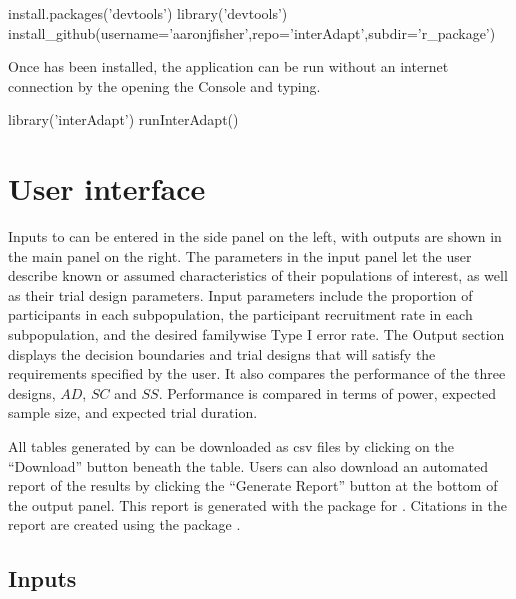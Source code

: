 \documentclass[article]{jss}
\begin{document}
\vspace{5 mm}
\begin{Code}
install.packages('devtools')
library('devtools')
install_github(username='aaronjfisher',repo='interAdapt',subdir='r_package')
\end{Code}
\vspace{5 mm}

Once  has been installed, the application can be run without an internet connection by the opening the  Console and typing.

\vspace{5 mm}
\begin{Code}
library('interAdapt')
runInterAdapt()
\end{Code}
\vspace{5 mm}




\section{User interface}
\label{sec:UI}

Inputs to  can be entered in the side panel on the left, with outputs are shown in the main panel on the right. %
The parameters in the input panel let the user describe known or assumed characteristics of their populations of interest, as well as their trial design parameters. Input parameters include the proportion of participants in each subpopulation, the participant recruitment rate in each subpopulation, and the desired familywise Type I error rate. The Output section displays the decision boundaries and trial designs that will satisfy the requirements specified by the user. It also compares the performance of the three designs, $AD$, $SC$ and $SS$. Performance is compared in terms of power, expected sample size, and expected trial duration.

All tables generated by  can be downloaded as csv files by clicking on the ``Download'' button beneath the table. Users can also download an automated report of the results by clicking the ``Generate Report'' button at the bottom of the output panel. This report is generated with the  package for  \citep{knitr}. Citations in the report are created using the  package \citep{knitcitations}.

\subsection{Inputs}
\label{sub:inputs}
\end{document}
